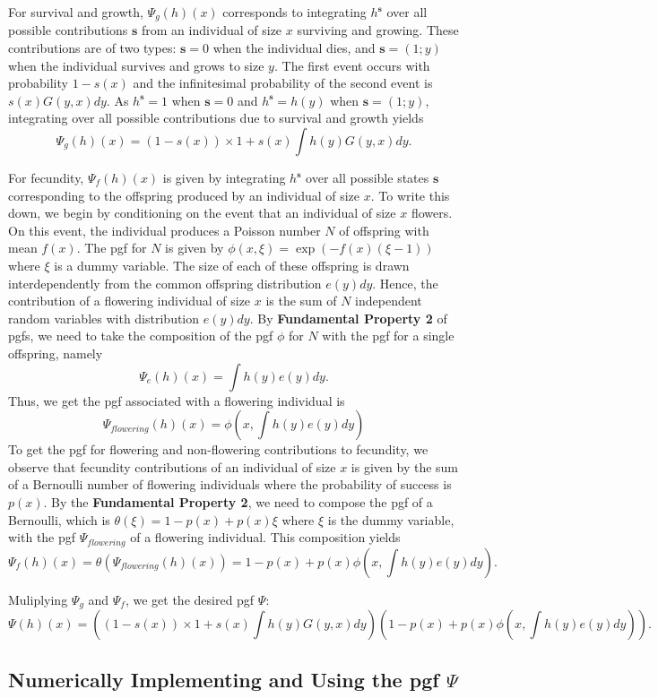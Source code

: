 \documentclass[12pt]{amsart}\usepackage[]{graphicx}\usepackage[]{color}
\def\s{\mathbf s}
\begin{document}
For survival and growth, $\Psi_g(h)(x)$ corresponds to integrating $h^\s$ over all possible contributions $\s$ from an individual of size $x$ surviving and growing. These contributions are of two types: $\s=0$ when the individual dies,  and $\s=(1;y)$ when the individual survives and grows to size $y$. The first event occurs with probability $1-s(x)$ and the infinitesimal probability of the second event is $s(x)G(y,x)dy$. As $h^\s=1$ when $\s=0$ and $h^\s=h(y)$ when $\s=(1;y)$, integrating over all possible contributions due to survival and growth yields
\[
\Psi_{g}(h)(x)=(1-s(x))\times 1 + s(x)\int h(y)G(y,x)dy.
\]

For fecundity, $\Psi_f(h)(x)$ is given by integrating $h^\s$ over all possible states $\s$ corresponding to the offspring produced by an individual of size $x$.  To write this down, we begin by conditioning on the event that an individual of size $x$ flowers. On this event, the individual produces a Poisson number $N$ of offspring with mean $f(x)$. The pgf for $N$ is given by $\phi(x,\xi)=\exp(-f(x)(\xi-1))$ where $\xi$ is a dummy variable. The size of each of these offspring is drawn interdependently from the common offspring distribution $e(y)dy$. Hence, the contribution of a flowering individual of size $x$ is the sum of $N$ independent random variables with distribution $e(y)dy$. By \textbf{Fundamental Property 2} of pgfs, we need to take the composition of the pgf $\phi$ for $N$ with the pgf for a single offspring, namely
\[
\Psi_e(h)(x)=\int h(y)e(y)dy.
\]
Thus, we get the pgf associated with a flowering individual is
\[
\Psi_{flowering}(h)(x)=\phi(x,\int h(y)e(y)dy)
\]
To get the pgf for flowering and non-flowering contributions to fecundity, we observe that fecundity contributions of an individual of size $x$ is given by the sum of a Bernoulli number of flowering individuals where the probability of success is $p(x)$. By the \textbf{Fundamental Property 2}, we need to compose the pgf of a Bernoulli, which is $\theta(\xi)=1-p(x)+p(x)\xi$ where $\xi$ is the dummy variable, with the pgf $\Psi_{flowering}$ of a flowering individual. This composition yields
\[
\Psi_f (h)(x)=\theta(\Psi_{flowering}(h)(x))=1-p(x)+p(x)\phi(x,\int h(y)e(y)dy).
\]


Muliplying $\Psi_g$ and $\Psi_f$, we get the desired pgf $\Psi$:
\[
\Psi(h)(x)=\left((1-s(x))\times 1 + s(x)\int h(y)G(y,x)dy\right)\left(1-p(x)+p(x)\phi(x,\int h(y)e(y)dy)\right).
\]


\subsection*{Numerically Implementing and Using the pgf $\Psi$}
\end{document}

